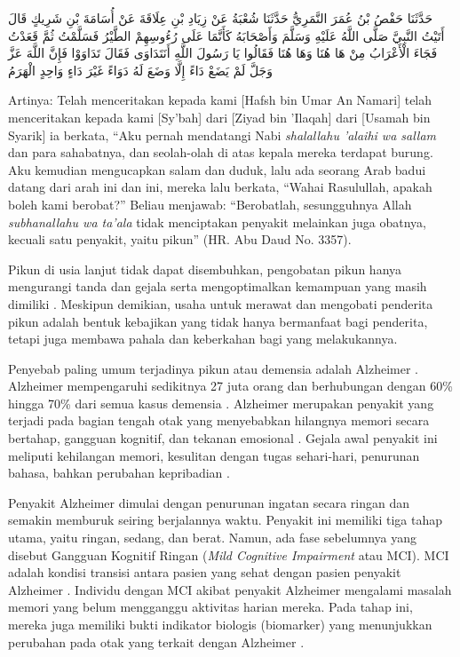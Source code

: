     \begin{flushright}
        \begin{RLtext}
            حَدَّثَنَا حَفْصُ بْنُ عُمَرَ النَّمَرِيُّ حَدَّثَنَا شُعْبَةُ عَنْ زِيَادِ بْنِ عِلَاقَةَ عَنْ أُسَامَةَ بْنِ شَرِيكٍ قَالَ أَتَيْتُ النَّبِيَّ صَلَّى اللَّهُ عَلَيْهِ وَسَلَّمَ وَأَصْحَابَهُ كَأَنَّمَا عَلَى رُءُوسِهِمْ الطَّيْرُ فَسَلَّمْتُ ثُمَّ قَعَدْتُ فَجَاءَ الْأَعْرَابُ مِنْ هَا هُنَا وَهَا هُنَا فَقَالُوا يَا رَسُولَ اللَّهِ أَنَتَدَاوَى فَقَالَ تَدَاوَوْا فَإِنَّ اللَّهَ عَزَّ وَجَلَّ لَمْ يَضَعْ دَاءً إِلَّا وَضَعَ لَهُ دَوَاءً غَيْرَ دَاءٍ وَاحِدٍ الْهَرَمُ
        \end{RLtext}
    \end{flushright}

    Artinya: Telah menceritakan kepada kami [Hafsh bin Umar An Namari] telah menceritakan kepada kami [Sy'bah] dari [Ziyad bin 'Ilaqah] dari [Usamah bin Syarik] ia berkata, “Aku pernah mendatangi Nabi \textit{shalallahu 'alaihi wa sallam} dan para sahabatnya, dan seolah-olah di atas kepala mereka terdapat burung. Aku kemudian mengucapkan salam dan duduk, lalu ada seorang Arab badui datang dari arah ini dan ini, mereka lalu berkata, “Wahai Rasulullah, apakah boleh kami berobat?” Beliau menjawab: “Berobatlah, sesungguhnya Allah \textit{subhanallahu wa ta'ala} tidak menciptakan penyakit melainkan juga obatnya, kecuali satu penyakit, yaitu pikun” (HR. Abu Daud No. 3357). 

    Pikun di usia lanjut tidak dapat disembuhkan, pengobatan pikun hanya mengurangi tanda dan gejala serta mengoptimalkan kemampuan yang masih dimiliki \autocite{Sari2022}. Meskipun demikian, usaha untuk merawat dan mengobati penderita pikun adalah bentuk kebajikan yang tidak hanya bermanfaat bagi penderita, tetapi juga membawa pahala dan keberkahan bagi yang melakukannya.

    Penyebab paling umum terjadinya pikun atau demensia adalah Alzheimer \autocite{Suangga2024}. Alzheimer mempengaruhi sedikitnya 27 juta orang dan berhubungan dengan 60\% hingga 70\% dari semua kasus demensia \autocite{Ferreira2014}. Alzheimer merupakan penyakit yang terjadi pada bagian tengah otak yang menyebabkan hilangnya memori secara bertahap, gangguan kognitif, dan tekanan emosional \autocite{Uddindar2023}. Gejala awal penyakit ini meliputi kehilangan memori, kesulitan dengan tugas sehari-hari, penurunan bahasa, bahkan perubahan kepribadian \autocite{Lim2022}.

    Penyakit Alzheimer dimulai dengan penurunan ingatan secara ringan dan semakin memburuk seiring berjalannya waktu. Penyakit ini memiliki tiga tahap utama, yaitu ringan, sedang, dan berat. Namun, ada fase sebelumnya yang disebut Gangguan Kognitif Ringan (\textit{Mild Cognitive Impairment} atau MCI). MCI adalah kondisi transisi antara pasien yang sehat dengan pasien penyakit Alzheimer . Individu dengan MCI akibat penyakit Alzheimer mengalami masalah memori yang belum mengganggu aktivitas harian mereka. Pada tahap ini, mereka juga memiliki bukti indikator biologis (biomarker) yang menunjukkan perubahan pada otak yang terkait dengan Alzheimer \autocite{Dorado2022}.

